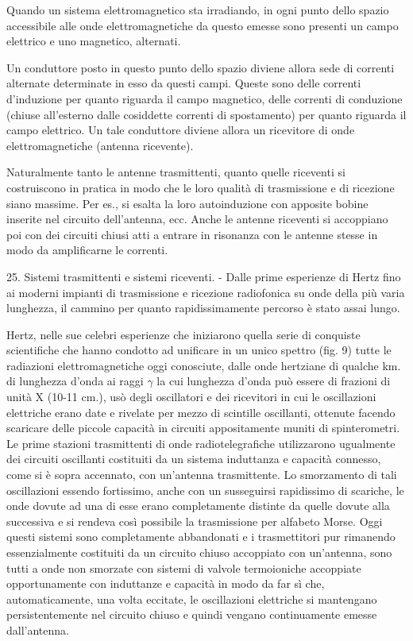 \documentclass[a4paper]{article}
\begin{document}
Quando un sistema elettromagnetico sta irradiando, in ogni punto dello spazio accessibile alle onde elettromagnetiche da questo emesse sono presenti un campo elettrico e uno magnetico, alternati.

Un conduttore posto in questo punto dello spazio diviene allora sede di correnti alternate determinate in esso da questi campi. Queste sono delle correnti d'induzione per quanto riguarda il campo magnetico, delle correnti di conduzione (chiuse all'esterno dalle cosiddette correnti di spostamento) per quanto riguarda il campo elettrico. Un tale conduttore diviene allora un ricevitore di onde elettromagnetiche (antenna ricevente).

Naturalmente tanto le antenne trasmittenti, quanto quelle riceventi si costruiscono in pratica in modo che le loro qualità di trasmissione e di ricezione siano massime. Per es., si esalta la loro autoinduzione con apposite bobine inserite nel circuito dell'antenna, ecc. Anche le antenne riceventi si accoppiano poi con dei circuiti chiusi atti a entrare in risonanza con le antenne stesse in modo da amplificarne le correnti.

25. Sistemi trasmittenti e sistemi riceventi. - Dalle prime esperienze di Hertz fino ai moderni impianti di trasmissione e ricezione radiofonica su onde della più varia lunghezza, il cammino per quanto rapidissimamente percorso è stato assai lungo.

Hertz, nelle sue celebri esperienze che iniziarono quella serie di conquiste scientifiche che hanno condotto ad unificare in un unico spettro (fig. 9) tutte le radiazioni elettromagnetiche oggi conosciute, dalle onde hertziane di qualche km. di lunghezza d'onda ai raggi $\gamma$ la cui lunghezza d'onda può essere di frazioni di unità X (10-11 cm.), usò degli oscillatori e dei ricevitori in cui le oscillazioni elettriche erano date e rivelate per mezzo di scintille oscillanti, ottenute facendo scaricare delle piccole capacità in circuiti appositamente muniti di spinterometri. Le prime stazioni trasmittenti di onde radiotelegrafiche utilizzarono ugualmente dei circuiti oscillanti costituiti da un sistema induttanza e capacità connesso, come si è sopra accennato, con un'antenna trasmittente. Lo smorzamento di tali oscillazioni essendo fortissimo, anche con un susseguirsi rapidissimo di scariche, le onde dovute ad una di esse erano completamente distinte da quelle dovute alla successiva e si rendeva così possibile la trasmissione per alfabeto Morse. Oggi questi sistemi sono completamente abbandonati e i trasmettitori pur rimanendo essenzialmente costituiti da un circuito chiuso accoppiato con un'antenna, sono tutti a onde non smorzate con sistemi di valvole termoioniche accoppiate opportunamente con induttanze e capacità in modo da far sì che, automaticamente, una volta eccitate, le oscillazioni elettriche si mantengano persistentemente nel circuito chiuso e quindi vengano continuamente emesse dall'antenna.
\end{document}
